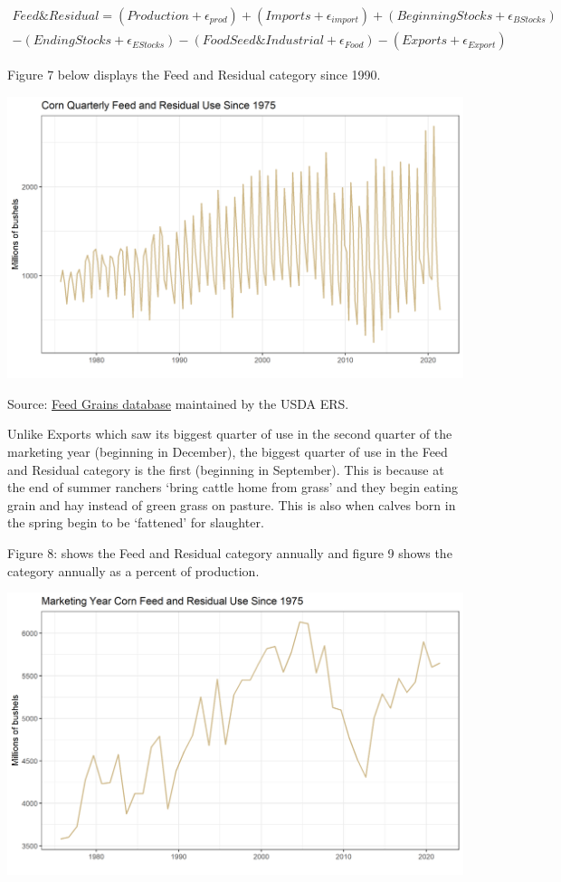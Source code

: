 \documentclass[
  letterpaper,
  DIV=11,
  numbers=noendperiod]{scrreprt}
\begin{document}
\(\begin{align} Feed\&Residual = (Production + \epsilon_{prod}) + (Imports + \epsilon_{import}) + (Beginning Stocks + \epsilon_{BStocks}) \\ - (Ending Stocks + \epsilon_{EStocks}) - (FoodSeed\&Industrial + \epsilon_{Food}) - (Exports + \epsilon_{Export}) \end{align}\)

Figure 7 below displays the Feed and Residual category since 1990.

\includegraphics{assets/ForecastingUseof-CornUseCategoriesFeedResid.png}

Source:
\href{http://www.ers.usda.gov/data-products/feed-grains-database/feed-grains-yearbook-tables.aspx\#26780}{Feed
Grains database} maintained by the USDA ERS.

Unlike Exports which saw its biggest quarter of use in the second
quarter of the marketing year (beginning in December), the biggest
quarter of use in the Feed and Residual category is the first (beginning
in September). This is because at the end of summer ranchers `bring
cattle home from grass' and they begin eating grain and hay instead of
green grass on pasture. This is also when calves born in the spring
begin to be `fattened' for slaughter.

Figure 8: shows the Feed and Residual category annually and figure 9
shows the category annually as a percent of production.

\includegraphics{assets/ForecastingUseof-FeedandResidualMY.png}
\end{document}
